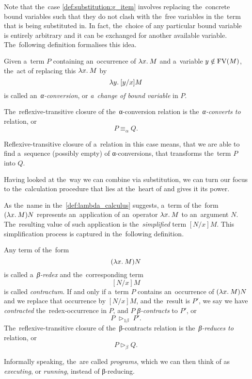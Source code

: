 Note that the~case \ref{def:substitution:g_item} involves replacing the~concrete
bound variables such that they do not clash with the~free variables in the~term
that is being substituted in. In fact, the~choice of any particular bound
variable is entirely arbitrary and it can be exchanged for another available
variable. The~following definition formalises this idea.

\begin{definition}
  Given a~term $P$ containing an~occurrence of $\lambda x . \: M$ and a~variable $y
  \notin \mathrm{FV}(M)$, the~act of replacing this $\lambda x . \: M$ by
  \[
    \lambda y . \: [y/x]M
  \]
  is called an~\emph{α-conversion}, or \emph{a~change of bound variable} in $P$.

  The~reflexive-transitive closure of the~α-conversion relation is
  the~\emph{α-converts to} relation, or
  \[
    P \equiv_\alpha Q.
  \]
\end{definition}

Reflexive-transitive closure of a~relation in this case means, that we are able
to find a~sequence (possibly empty) of α-conversions, that transforms the~term
$P$ into $Q$.

Having looked at the~way we can combine \lts via substitution, we can turn our
focus to the~calculation procedure that lies at the~heart of \lc and gives it
its power.


As the~name in the~\autoref{def:lambda_calculus} suggests, a~term of
the~form $(\lambda x . \: M) N$ represents an~application of an~operator $\lambda x . \: M$ to
an~argument $N$. The~resulting value of such application is
the~\emph{simplified} term $[N/x]M$. This simplification process is captured in
the~following definition.

\begin{definition}
  Any term of the~form
  \[
    (\lambda x . \: M) N
  \]
  is called a~\emph{β-redex} and the~corresponding term
  \[
    [N/x]M
  \]
  is called \emph{contractum}. If and only if a~term $P$ contains an~occurrence
  of $(\lambda x . \: M) N$ and we replace that occurrence by $[N/x]M$, and the~result
  is $P'$, we say we have \emph{contracted} the~redex-occurrence in $P$, and $P$
  \emph{β-contracts} to $P'$, or
  \[
    P \; \triangleright_{1\beta} \; P'.
  \]
  The~reflexive-transitive closure of the~β-contracts relation is
  the~\emph{β-reduces to} relation, or
  \[
    P \triangleright_\beta Q.
  \]
\end{definition}

Informally speaking, the~\lts are called \emph{programs}, which we can then
think of as \emph{executing}, or \emph{running}, instead of β-reducing.


